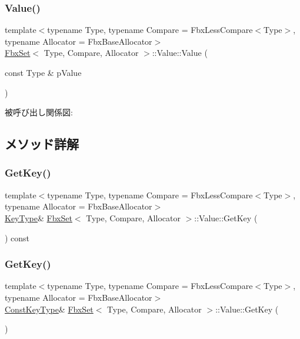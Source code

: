 \subsubsection{\texorpdfstring{Value()}{Value()}}
{\footnotesize\ttfamily template$<$typename Type, typename Compare = Fbx\+Less\+Compare$<$\+Type$>$, typename Allocator = Fbx\+Base\+Allocator$>$ \\
\hyperlink{class_fbx_set}{Fbx\+Set}$<$ Type, Compare, Allocator $>$\+::Value\+::\+Value (\begin{DoxyParamCaption}\item[{const Type \&}]{p\+Value }\end{DoxyParamCaption})}

被呼び出し関係図\+:


\subsection{メソッド詳解}
\mbox{\label{class_fbx_set_1_1_value_a498538bf1bf1d1c9fd4b85853e92ff62}} 
\subsubsection{\texorpdfstring{Get\+Key()}{GetKey()}\hspace{0.1cm}{\footnotesize\ttfamily [1/2]}}
{\footnotesize\ttfamily template$<$typename Type, typename Compare = Fbx\+Less\+Compare$<$\+Type$>$, typename Allocator = Fbx\+Base\+Allocator$>$ \\
\hyperlink{class_fbx_set_1_1_value_ad4958bd8730776f19c1309f457158acf}{Key\+Type}\& \hyperlink{class_fbx_set}{Fbx\+Set}$<$ Type, Compare, Allocator $>$\+::Value\+::\+Get\+Key (\begin{DoxyParamCaption}{ }\end{DoxyParamCaption}) const}

\mbox{\label{class_fbx_set_1_1_value_a9fe85101a41e5883c6f0d7fc8eaa4cf3}} 
\subsubsection{\texorpdfstring{Get\+Key()}{GetKey()}\hspace{0.1cm}{\footnotesize\ttfamily [2/2]}}
{\footnotesize\ttfamily template$<$typename Type, typename Compare = Fbx\+Less\+Compare$<$\+Type$>$, typename Allocator = Fbx\+Base\+Allocator$>$ \\
\hyperlink{class_fbx_set_1_1_value_a184e74f6d42151d97b2c1381b5f642e7}{Const\+Key\+Type}\& \hyperlink{class_fbx_set}{Fbx\+Set}$<$ Type, Compare, Allocator $>$\+::Value\+::\+Get\+Key (\begin{DoxyParamCaption}{ }\end{DoxyParamCaption})}

